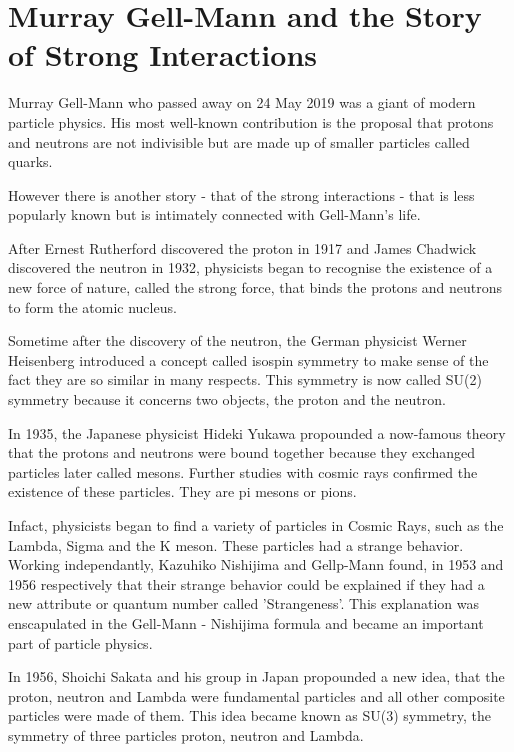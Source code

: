\chapter[Murray Gell-Mann and the Story of Strong Interaction]{Murray Gell-Mann and the Story of Strong Interactions}\label{chap6}



 \authinfo{}

Murray Gell-Mann who passed away on 24 May 2019 was a giant of modern
particle physics. His most well-known contribution is the proposal that
protons and neutrons are not indivisible but are made up of smaller
particles called quarks.

However there is another story - that of the strong interactions - that
is less popularly known but is intimately connected with Gell-Mann's
life.

After Ernest Rutherford discovered the proton in 1917 and James Chadwick
discovered the neutron in 1932, physicists began to recognise the existence
of a new force of nature, called the strong force, that binds the protons
and neutrons to form the atomic nucleus.

Sometime after the discovery of the neutron, the German physicist Werner
Heisenberg introduced a concept called isospin symmetry to make sense of
the fact they are so similar in many respects. This symmetry is now called
SU(2) symmetry because it concerns two objects, the proton and the neutron.

In 1935, the Japanese physicist Hideki Yukawa propounded a now-famous theory
that the protons and neutrons were bound together because they exchanged
particles later called mesons. Further studies with cosmic rays confirmed
the existence of these particles. They are pi mesons or pions.

Infact, physicists began to find a variety of particles in Cosmic Rays,
such as the Lambda, Sigma and the K meson. These particles had a strange
behavior. Working independantly, Kazuhiko Nishijima and Gellp-Mann
found, in 1953 and 1956 respectively that their strange behavior could
be explained if they had a new attribute or quantum number called
'Strangeness'. This explanation was enscapulated in the Gell-Mann - Nishijima
formula and became an important part of particle physics.

In 1956, Shoichi Sakata and his group in Japan propounded a new idea, that
the proton, neutron and Lambda were fundamental particles and all other
composite particles were made of them. This idea became known as SU(3)
symmetry, the symmetry of three particles proton, neutron and Lambda.

